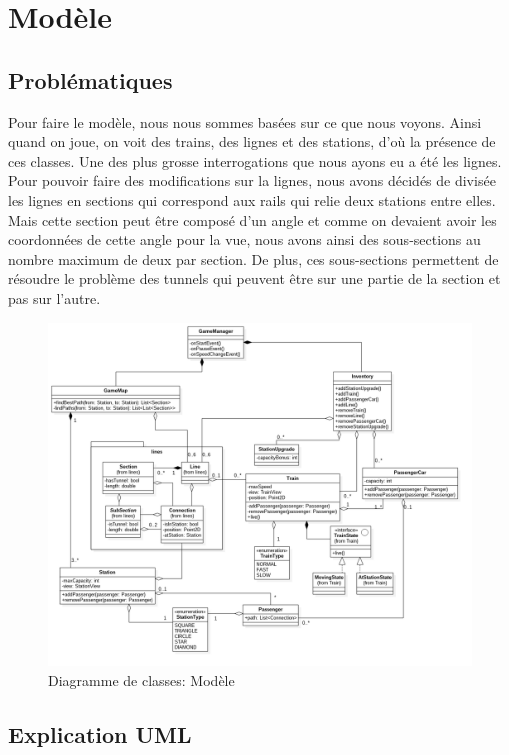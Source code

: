 \documentclass[report, backcover, french, nodocumentinfo]{upmethodology-document}
\begin{document}
		\section{Modèle}
			\subsection{Problématiques}
				\p{}
					Pour faire le modèle, nous nous sommes basées sur ce que nous voyons. Ainsi quand on joue, on voit des trains, des lignes et des stations, d'où la présence de ces classes. Une des plus grosse interrogations que nous ayons eu a été les lignes. Pour pouvoir faire des modifications sur la lignes, nous avons décidés de divisée les lignes en sections qui correspond aux rails qui relie deux stations entre elles. Mais cette section peut être composé d'un angle et comme on devaient avoir les coordonnées de cette angle pour la vue, nous avons ainsi des sous-sections au nombre maximum de deux par section. De plus, ces sous-sections permettent de résoudre le problème des tunnels qui peuvent être sur une partie de la section et pas sur l'autre.
					\begin{figure}[h!]
						\centering
						\includegraphics[width=1\textwidth]{figures/ModelClassDiagram}
						\caption{Diagramme de classes: Modèle}
						\label{fig:ModelClassDiagram}
					\end{figure}
			\subsection{Explication UML}
\end{document}

